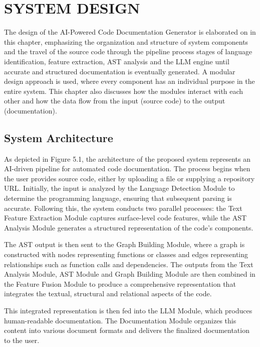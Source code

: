 \chapter{SYSTEM DESIGN}
\hspace{0.5cm}
The design of the AI-Powered Code Documentation Generator is elaborated on in this chapter, emphasizing the organization and structure of system components and the travel of the source code through the pipeline process stages of language identification, feature extraction, AST analysis and the LLM engine until accurate and structured documentation is eventually generated. A modular design approach is used, where every component has an individual purpose in the entire system. This chapter also discusses how the modules interact with each other and how the data flow from the input (source code) to the output (documentation). 
\section{System Architecture}
\hspace{0.5cm}
As depicted in Figure 5.1, the architecture of the proposed system represents an AI-driven pipeline for automated code documentation. The process begins when the user provides source code, either by uploading a file or supplying a repository URL. Initially, the input is analyzed by the Language Detection Module to determine the programming language, ensuring that subsequent parsing is accurate. Following this, the system conducts two parallel processes: the Text Feature Extraction Module captures surface-level code features, while the AST Analysis Module generates a structured representation of the code’s components.

\par The AST output is then sent to the Graph Building Module, where a graph is constructed with nodes representing functions or classes and edges representing relationships such as function calls and dependencies. The outputs from the Text Analysis Module, AST Module and Graph Building Module are then combined in the Feature Fusion Module to produce a comprehensive representation that integrates the textual, structural and relational aspects of the code.
\par This integrated representation is then fed into the LLM Module, which produces human-readable documentation. The Documentation Module organizes this content into various document formats and delivers the finalized documentation to the user.
\newline


